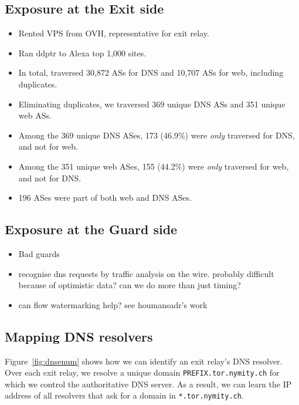 \subsection{Exposure at the Exit side}
\begin{itemize}
	\item Rented VPS from OVH, representative for exit relay.
	\item Ran ddptr to Alexa top 1,000 sites.
	\item In total, traversed 30,872 ASs for DNS and 10,707 ASs for web,
		including duplicates.
	\item Eliminating duplicates, we traversed 369 unique DNS ASs and 351 unique
		web ASs.
	\item Among the 369 unique DNS ASes, 173 (46.9\%) were \emph{only} traversed
		for DNS, and not for web.
	\item Among the 351 unique web ASes, 155 (44.2\%) were \emph{only} traversed
		for web, and not for DNS.
	\item 196 ASes were part of both web and DNS ASes.
\end{itemize}

\subsection{Exposure at the Guard side}
\begin{itemize}
	\item Bad guards
	\item recognise dns requests by traffic analysis on the wire.  probably
		difficult because of optimistic data?  can we do more than just timing?
	\item can flow watermarking help?  see houmansadr's
		work~\cite{Houmansadr2011a}
\end{itemize}

\subsection{Mapping DNS resolvers}
Figure~\ref{fig:dnsenum} shows how we can identify an exit relay's DNS resolver.
Over each exit relay, we resolve a unique domain \texttt{PREFIX.tor.nymity.ch}
for which we control the authoritative DNS server.  As a result, we can learn
the IP address of all resolvers that ask for a domain in
\texttt{*.tor.nymity.ch}.

